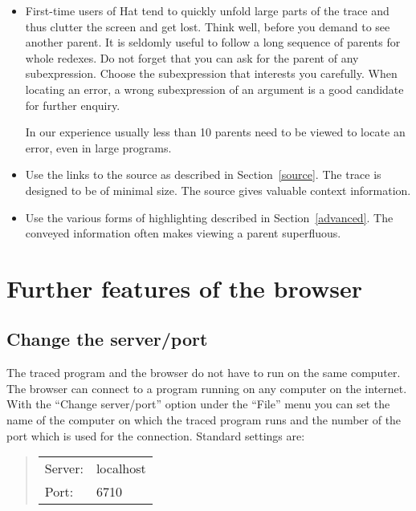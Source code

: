 \documentclass[12pt]{article}
\begin{document}
\begin{itemize}
\item First-time users of Hat tend to quickly unfold large parts of the trace and thus clutter the screen and get lost. Think well, before you demand to see another parent. It is seldomly useful to follow a long sequence of parents for whole redexes. Do not forget that you can ask for the parent of any subexpression. Choose the subexpression that interests you carefully. When locating an error, a wrong subexpression of an argument is a good candidate for further enquiry.

In our experience usually less than 10 parents need to be viewed to locate an error, even in large programs.

\item Use the links to the source as described in Section~\ref{source}. The trace is designed to be of minimal size. The source gives valuable context information.

\item Use the various forms of highlighting described in Section~\ref{advanced}. The conveyed information often makes viewing a parent superfluous.

\end{itemize}


\section{Further features of the browser}

\subsection{Change the server/port}

The traced program and the browser do not have to run on the same computer.
The browser can connect to a program running on any computer on the internet.
With the ``Change server/port'' option under the ``File'' menu you can set the name of the computer on which the traced program runs and the number of the port which is used for the connection. Standard settings are:
\begin{quote}
\begin{tabular}{ll}
Server: & localhost \\
Port: & 6710 \\
\end{tabular}
\end{quote}
\end{document}
